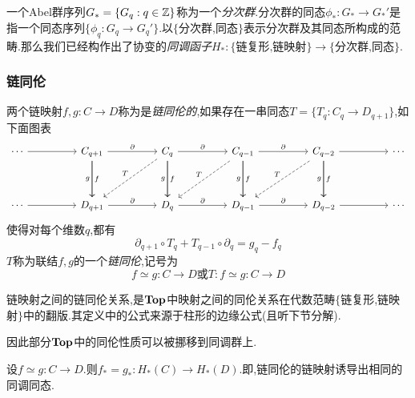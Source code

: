\documentclass{article}
\begin{document}
一个Abel群序列$G_* = \{G_q : q \in \mathbb{Z}\}$称为一个\emph{分次群}.分次群的同态$\phi_* : G_* \to G_*'$是指一个同态序列$\{\phi_q : G_q \to G_q'\}$.以$\{$分次群,同态$\}$表示分次群及其同态所构成的范畴.那么我们已经构作出了协变的\emph{同调函子}$H_*: \{\text{链复形,链映射}\} \to \{\text{分次群,同态}\}$.
\subsubsection{链同伦}
\begin{definition}
    两个链映射$f,g : C \to D$称为是\emph{链同伦的},如果存在一串同态$T = \{T_q : C_q \to D_{q+1}\}$,如下面图表
    \[\begin{tikzcd}
        \cdots && {C_{q+1}} && {C_q} && {C_{q-1}} && {C_{q-2}} && \cdots \\
        \\
        \cdots && {D_{q+1}} && {D_q} && {D_{q-1}} && {D_{q-2}} && \cdots
        \arrow[from=1-1, to=1-3]
        \arrow["\partial", from=1-3, to=1-5]
        \arrow["\partial", from=1-5, to=1-7]
        \arrow["\partial", from=1-7, to=1-9]
        \arrow[from=1-9, to=1-11]
        \arrow[from=3-1, to=3-3]
        \arrow["\partial", from=3-3, to=3-5]
        \arrow["\partial", from=3-5, to=3-7]
        \arrow["\partial", from=3-7, to=3-9]
        \arrow[from=3-9, to=3-11]
        \arrow["{g }"', from=1-3, to=3-3]
        \arrow["f", from=1-7, to=3-7]
        \arrow["f", from=1-9, to=3-9]
        \arrow["T"', dashed, from=1-5, to=3-3]
        \arrow["f", from=1-3, to=3-3]
        \arrow["g"', from=1-5, to=3-5]
        \arrow["f", from=1-5, to=3-5]
        \arrow["g"', from=1-7, to=3-7]
        \arrow["g"', from=1-9, to=3-9]
        \arrow["T"', dashed, from=1-7, to=3-5]
        \arrow["T"', dashed, from=1-9, to=3-7]
    \end{tikzcd}\]
    使得对每个维数$q$,都有
    $$
    \partial_{q+1} \circ T_q + T_{q-1}\circ \partial_q = g_q - f_q
    $$
    $T$称为联结$f,g$的一个\emph{链同伦},记号为
    $$
    f \simeq g : C \to D \text{或} T : f \simeq g : C \to D
    $$
\end{definition}
\begin{remark}
    链映射之间的链同伦关系,是$\bold{Top}$中映射之间的同伦关系在代数范畴$\{$链复形,链映射$\}$中的翻版.其定义中的公式来源于柱形的边缘公式(且听下节分解).
\end{remark}
因此部分$\bold{Top}$中的同伦性质可以被挪移到同调群上.
\begin{theorem}
    设$f \simeq g: C \to D$.则$f_* = g_*: H_*(C) \to H_*(D)$.即,链同伦的链映射诱导出相同的同调同态.
\end{theorem}
\end{document}
